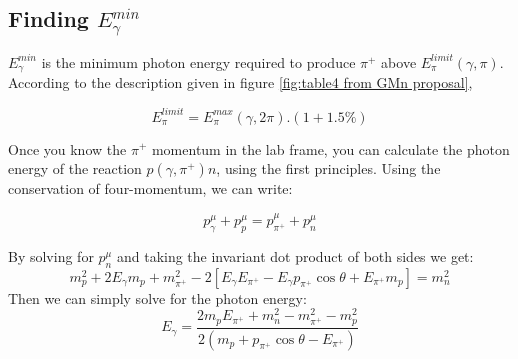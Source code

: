 \subsection{Finding  $E^{min}_\gamma$}\label{sec:E_gamma_min}
 $E^{min}_\gamma$ is the minimum photon energy required to produce $\pi^+$ above $E^{limit}_{\pi}(\gamma,\pi)$. According to the description given in figure \ref{fig:table4 from GMn proposal},

 \begin{equation}
    E^{limit}_{\pi} = E^{max}_{\pi}(\gamma,2\pi).(1 + 1.5\%)
 \end{equation}



Once you know the $\pi^+$ momentum in the lab frame, you can calculate the photon energy of the reaction $p(\gamma,\pi^+)n$, using the first principles. Using the conservation of four-momentum, we can write:

\begin{equation}
    p_\gamma^\mu + p_p^\mu = p_{\pi^+}^\mu + p_n^\mu
\end{equation}

By solving for $p_n^\mu$ and taking the invariant dot product of both sides we get:
\begin{equation}
    m_p^2 + 2E_{\gamma}m_p + m_{\pi^+}^2 -2[E_{\gamma}E_{\pi^+} - E_{\gamma}p_{\pi^+}\cos{\theta} + E_{\pi^+}m_p] = m_n^2 
\end{equation}
Then we can simply solve for the photon energy:
\begin{equation}\label{equ:  photonE_formula}
    E_{\gamma} = \frac{ 2m_pE_{\pi^+} + m_n^2 - m_{\pi^+}^2 - m_p^2 }{ 2( m_p + p_{\pi^+}\cos{\theta} - E_{\pi^+} ) }
\end{equation}

